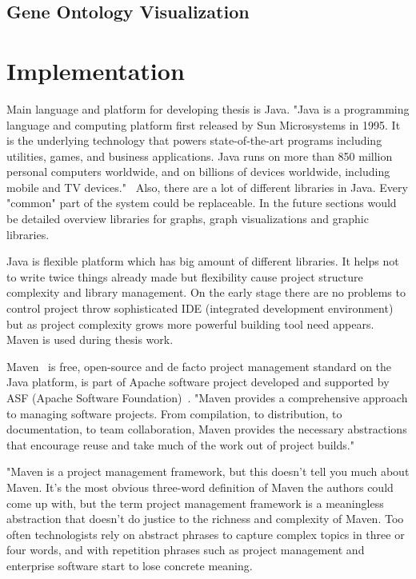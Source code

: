 \documentclass[a4paper,oneside]{article}
\begin{document}
\subsection{Gene Ontology Visualization}

\section{Implementation}
\label{implementation}
Main language and platform for developing thesis is Java. "Java is a programming language and computing platform first released by Sun Microsystems in 1995. It is the underlying technology that powers state-of-the-art programs including utilities, games, and business applications. Java runs on more than 850 million personal computers worldwide, and on billions of devices worldwide, including mobile and TV devices."~\cite{java_com} Also, there are a lot of different libraries in Java. Every "common" part of the system could be replaceable. In the future sections would be detailed overview libraries for graphs, graph visualizations and graphic libraries.


Java is flexible platform which has big amount of different libraries. It helps not to write twice things already made but flexibility cause project structure complexity and library management. On the early stage there are no problems to control project throw sophisticated IDE (integrated development environment) but as project complexity grows more powerful building tool need appears. Maven is used during thesis work. 


Maven~\cite{MAVEN_HOME_PAGE} is free, open-source and de facto project management standard on the Java platform, is part of Apache software project developed and supported by ASF (Apache Software Foundation)~\cite{APACHE_FOUNDATION_HOME_PAGE}. "Maven provides a comprehensive approach to managing software projects. From compilation, to distribution, to documentation, to team collaboration, Maven provides the necessary abstractions that encourage reuse and take much of the work out of project builds."~\cite{MAVEN_BOOK_1}


"Maven is a project management framework, but this doesn't tell you much about Maven. It's the most obvious three-word definition of Maven the authors could come up with, but the term project management framework is a meaningless abstraction that doesn't do justice to the richness and complexity of Maven. Too often technologists rely on abstract phrases to capture complex topics in three or four words, and with repetition phrases such as project management and enterprise software start to lose concrete meaning.
\end{document}
